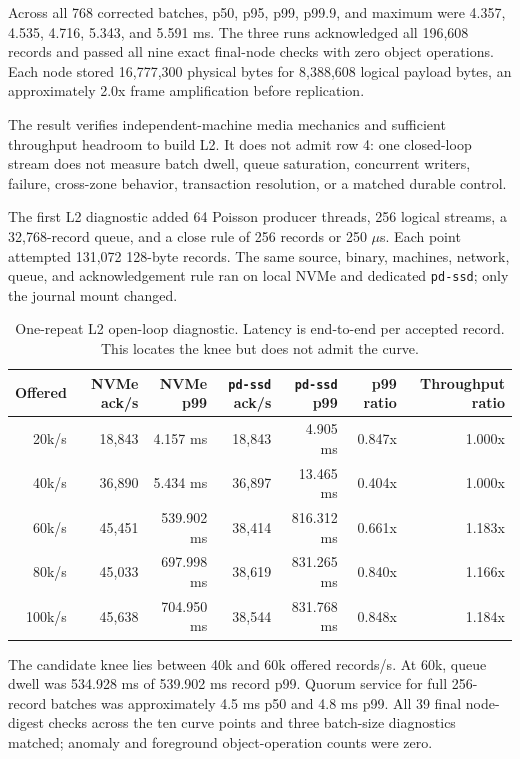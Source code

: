 \documentclass[sigconf,nonacm]{acmart}
\begin{document}
Across all 768 corrected batches, p50, p95, p99, p99.9, and maximum were
4.357, 4.535, 4.716, 5.343, and 5.591 ms. The three runs acknowledged all
196,608 records and passed all nine exact final-node checks with zero object
operations. Each node stored 16,777,300 physical bytes for 8,388,608 logical
payload bytes, an approximately 2.0x frame amplification before replication.

The result verifies independent-machine media mechanics and sufficient
throughput headroom to build L2. It does not admit row 4: one closed-loop stream
does not measure batch dwell, queue saturation, concurrent writers, failure,
cross-zone behavior, transaction resolution, or a matched durable control.

The first L2 diagnostic added 64 Poisson producer threads, 256 logical streams,
a 32,768-record queue, and a close rule of 256 records or 250 $\mu$s. Each point
attempted 131,072 128-byte records. The same source, binary, machines, network,
queue, and acknowledgement rule ran on local NVMe and dedicated \texttt{pd-ssd};
only the journal mount changed.

\begin{table}[t]
  \centering
  \small
  \caption{One-repeat L2 open-loop diagnostic. Latency is end-to-end per
  accepted record. This locates the knee but does not admit the curve.}
  \label{tab:txlogopenloop}
  \begin{tabularx}{\textwidth}{@{}r r r r r r r@{}}
    \toprule
    Offered & NVMe ack/s & NVMe p99 & \texttt{pd-ssd} ack/s & \texttt{pd-ssd} p99 & p99 ratio & Throughput ratio \\
    \midrule
    20k/s  & 18,843 & 4.157 ms   & 18,843 & 4.905 ms   & 0.847x & 1.000x \\
    40k/s  & 36,890 & 5.434 ms   & 36,897 & 13.465 ms  & 0.404x & 1.000x \\
    60k/s  & 45,451 & 539.902 ms & 38,414 & 816.312 ms & 0.661x & 1.183x \\
    80k/s  & 45,033 & 697.998 ms & 38,619 & 831.265 ms & 0.840x & 1.166x \\
    100k/s & 45,638 & 704.950 ms & 38,544 & 831.768 ms & 0.848x & 1.184x \\
    \bottomrule
  \end{tabularx}
\end{table}

The candidate knee lies between 40k and 60k offered records/s. At 60k, queue
dwell was 534.928 ms of 539.902 ms record p99. Quorum service for full
256-record batches was approximately 4.5 ms p50 and 4.8 ms p99. All 39 final
node-digest checks across the ten curve points and three batch-size diagnostics
matched; anomaly and foreground object-operation counts were zero.
\end{document}
